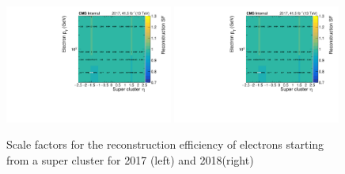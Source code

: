 \begin{figure}[ht!]
  \begin{center}
    \includegraphics[width=0.49\textwidth]{fig/efficiency/lepton/ele_eff_reco_2017.pdf}
    \includegraphics[width=0.49\textwidth]{fig/efficiency/lepton/ele_eff_reco_2017.pdf}\\
    \caption{
      Scale factors for the reconstruction efficiency of electrons starting from a super cluster for 2017 (left) and 2018(right)
    }
    \label{fig:sf_electron_reco}
  \end{center}
\end{figure}
